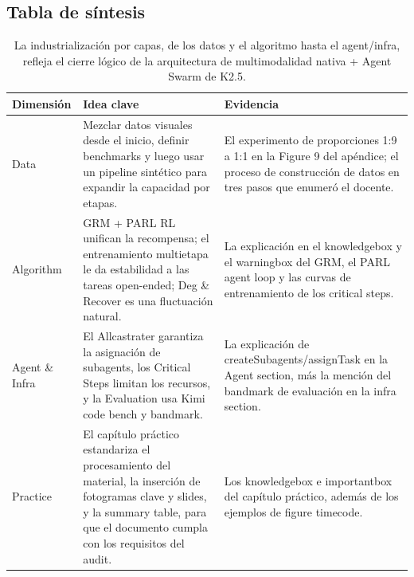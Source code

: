 \documentclass[a4paper]{article}
\begin{document}
\subsection{Tabla de síntesis}
\begin{table}[H]
\footnotesize
\centering
\begin{tabular}{p{3cm}p{7cm}p{4cm}}
\toprule
Dimensión & Idea clave & Evidencia \\
\midrule
Data & Mezclar datos visuales desde el inicio, definir benchmarks y luego usar un pipeline sintético para expandir la capacidad por etapas. & El experimento de proporciones 1:9 a 1:1 en la Figure 9 del apéndice; el proceso de construcción de datos en tres pasos que enumeró el docente. \\
Algorithm & GRM + PARL RL unifican la recompensa; el entrenamiento multietapa le da estabilidad a las tareas open-ended; Deg \& Recover es una fluctuación natural. & La explicación en el knowledgebox y el warningbox del GRM, el PARL agent loop y las curvas de entrenamiento de los critical steps. \\
Agent \& Infra & El Allcastrater garantiza la asignación de subagents, los Critical Steps limitan los recursos, y la Evaluation usa Kimi code bench y bandmark. & La explicación de createSubagents/assignTask en la Agent section, más la mención del bandmark de evaluación en la infra section. \\
Practice & El capítulo práctico estandariza el procesamiento del material, la inserción de fotogramas clave y slides, y la summary table, para que el documento cumpla con los requisitos del audit. & Los knowledgebox e importantbox del capítulo práctico, además de los ejemplos de figure timecode. \\
\bottomrule
\end{tabular}
\caption{La industrialización por capas, de los datos y el algoritmo hasta el agent/infra, refleja el cierre lógico de la arquitectura de multimodalidad nativa + Agent Swarm de K2.5.}
\end{table}
\end{document}

